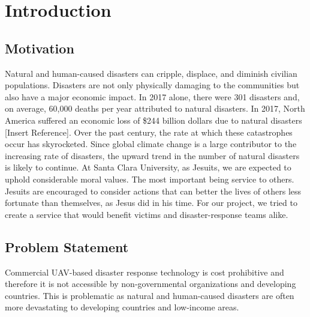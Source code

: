 \chapter{Introduction}
\section{Motivation}
Natural and human-caused disasters can cripple, displace, and diminish civilian populations. Disasters are not only physically damaging to the communities but also have a major economic impact. In 2017 alone, there were 301 disasters and, on average, 60,000 deaths per year attributed to natural disasters. In 2017, North America suffered an economic loss of \$244 billion dollars due to natural disasters [Insert Reference]. Over the past century, the rate at which these catastrophes occur has skyrocketed. Since global climate change is a large contributor to the increasing rate of disasters, the upward trend in the number of natural disasters is likely to continue.
At Santa Clara University, as Jesuits, we are expected to uphold considerable moral values. The most important being service to others. Jesuits are encouraged to consider actions that can better the lives of others less fortunate than themselves, as Jesus did in his time. For our project, we tried to create a service that would benefit victims and disaster-response teams alike. 

\section{Problem Statement}

Commercial UAV-based disaster response technology is cost prohibitive and therefore it is not accessible by non-governmental organizations and developing countries. This is problematic as natural and human-caused disasters are often more devastating to developing countries and low-income areas. 

